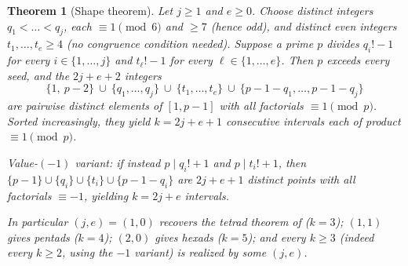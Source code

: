 \documentclass[11pt]{article}
\newtheorem{theorem}{Theorem}[section]
\theoremstyle{definition}
\theoremstyle{remark}
\begin{document}
\begin{theorem}[Shape theorem]\label{thm:shape}
Let $j \ge 1$ and $e \ge 0$. Choose distinct integers
$q_1 < \dots < q_j$, each $\equiv 1 \pmod 6$ and $\ge 7$ (hence odd), and
distinct even integers $t_1, \dots, t_e \ge 4$ (no congruence condition
needed). Suppose a prime $p$ divides $q_i! - 1$ for every
$i \in \{1, \dots, j\}$ and $t_\ell! - 1$ for every
$\ell \in \{1, \dots, e\}$. Then $p$ exceeds every seed, and the $2j + e + 2$
integers
\[
  \{1,\ p-2\} \ \cup\ \{q_1, \dots, q_j\} \ \cup\ \{t_1, \dots, t_e\}
  \ \cup\ \{p-1-q_1, \dots, p-1-q_j\}
\]
are pairwise distinct elements of $[1, p-1]$ with all factorials
$\equiv 1 \pmod p$. Sorted increasingly, they yield $k = 2j + e + 1$
consecutive intervals each of product $\equiv 1 \pmod p$.

\emph{Value-$(-1)$ variant:} if instead $p \mid q_i! + 1$ and
$p \mid t_i! + 1$, then $\{p-1\} \cup \{q_i\} \cup \{t_i\} \cup
\{p-1-q_i\}$ are $2j + e + 1$ distinct points with all factorials
$\equiv -1$, yielding $k = 2j + e$ intervals.

In particular $(j, e) = (1, 0)$ recovers the tetrad theorem of \cite{AAHS}
($k = 3$); $(1, 1)$ gives pentads ($k = 4$); $(2, 0)$ gives hexads
($k = 5$); and every $k \ge 3$ (indeed every $k \ge 2$, using the $-1$
variant) is realized by some $(j, e)$.
\end{theorem}
\end{document}
